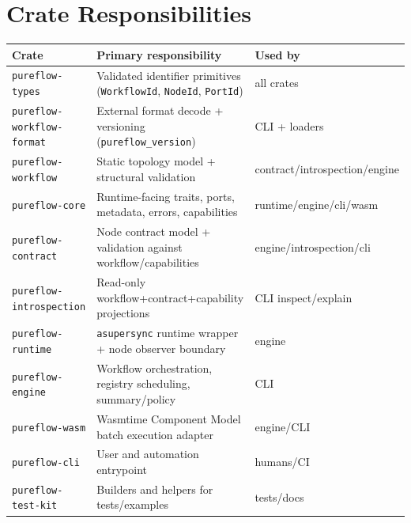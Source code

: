\documentclass[
  letterpaper,
]{report}
\begin{document}
\section{Crate Responsibilities}\label{crate-responsibilities}

\begin{longtable}[]{@{}
  >{\raggedright\arraybackslash}p{}
  >{\raggedright\arraybackslash}p{}
  >{\raggedright\arraybackslash}p{}@{}}
\toprule\noalign{}
\begin{minipage}[b]{\linewidth}\raggedright
Crate
\end{minipage} & \begin{minipage}[b]{\linewidth}\raggedright
Primary responsibility
\end{minipage} & \begin{minipage}[b]{\linewidth}\raggedright
Used by
\end{minipage} \\
\midrule\noalign{}
\endhead
\bottomrule\noalign{}
\endlastfoot
\texttt{pureflow-types} & Validated identifier primitives
(\texttt{WorkflowId}, \texttt{NodeId}, \texttt{PortId}) & all crates \\
\texttt{pureflow-workflow-format} & External format decode + versioning
(\texttt{pureflow\_version}) & CLI + loaders \\
\texttt{pureflow-workflow} & Static topology model + structural
validation & contract/introspection/engine \\
\texttt{pureflow-core} & Runtime-facing traits, ports, metadata, errors,
capabilities & runtime/engine/cli/wasm \\
\texttt{pureflow-contract} & Node contract model + validation against
workflow/capabilities & engine/introspection/cli \\
\texttt{pureflow-introspection} & Read-only workflow+contract+capability
projections & CLI inspect/explain \\
\texttt{pureflow-runtime} & \texttt{asupersync} runtime wrapper + node
observer boundary & engine \\
\texttt{pureflow-engine} & Workflow orchestration, registry scheduling,
summary/policy & CLI \\
\texttt{pureflow-wasm} & Wasmtime Component Model batch execution adapter
& engine/CLI \\
\texttt{pureflow-cli} & User and automation entrypoint & humans/CI \\
\texttt{pureflow-test-kit} & Builders and helpers for tests/examples &
tests/docs \\
\end{longtable}
\end{document}
